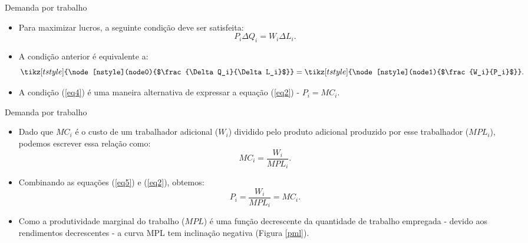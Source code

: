 \documentclass[10pt]{beamer}
\begin{document}
\begin{frame}{Demanda por trabalho}
    \begin{itemize}
        \item Para maximizar lucros, a seguinte condição deve ser satisfeita:\medskip
              \begin{equation}
                  P_i\Delta Q_i = W_i \Delta L_i.
                  \label{eq3}
              \end{equation}\bigskip

        \item A condição anterior é equivalente a:\medskip
              \begin{equation}
                  \tikz[tstyle]{\node[nstyle](node0){$\frac{\Delta Q_i}{\Delta L_i}$}} = \tikz[tstyle]{\node[nstyle](node1){$\frac{W_i}{P_i}$}}.
                  \label{eq4}
              \end{equation}\bigskip

        \item A condição (\ref{eq4}) é uma maneira alternativa de expressar a equação (\ref{eq2}) - $P_i = MC_i$.
    \end{itemize}
\end{frame}

\begin{frame}{Demanda por trabalho}
    \begin{itemize}
        \item Dado que $MC_i$ é o custo de um trabalhador adicional ($W_i$) dividido pelo produto adicional produzido por esse trabalhador ($MPL_i$), podemos escrever essa relação como:
              \begin{equation}
                  MC_i = \frac{W_i}{MPL_i}.
                  \label{eq5}
              \end{equation}

        \item Combinando as equações (\ref{eq5}) e (\ref{eq2}), obtemos:
              \begin{equation}
                  P_i = \frac{W_i}{MPL_i} = MC_i.
                  \label{eq6}
              \end{equation}

        \item Como a produtividade marginal do trabalho ($MPL$) é uma função decrescente da quantidade de trabalho empregada - devido aos rendimentos decrescentes - a curva MPL tem inclinação negativa (Figura \ref{pml}).
    \end{itemize}
\end{frame}
\end{document}
